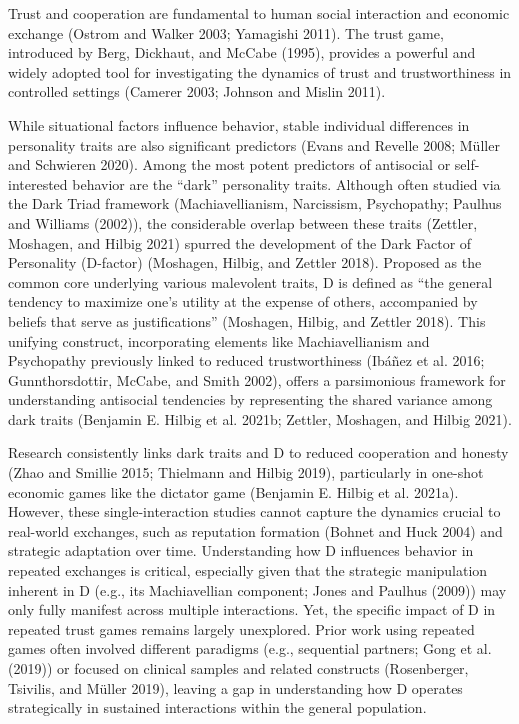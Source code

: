 \documentclass[
]{article}
\begin{document}
Trust and cooperation are fundamental to human social interaction and economic exchange (Ostrom and Walker 2003; Yamagishi 2011). The trust game, introduced by Berg, Dickhaut, and McCabe (1995), provides a powerful and widely adopted tool for investigating the dynamics of trust and trustworthiness in controlled settings (Camerer 2003; Johnson and Mislin 2011).

While situational factors influence behavior, stable individual differences in personality traits are also significant predictors (Evans and Revelle 2008; Müller and Schwieren 2020). Among the most potent predictors of antisocial or self-interested behavior are the ``dark'' personality traits. Although often studied via the Dark Triad framework (Machiavellianism, Narcissism, Psychopathy; Paulhus and Williams (2002)), the considerable overlap between these traits (Zettler, Moshagen, and Hilbig 2021) spurred the development of the Dark Factor of Personality (D-factor) (Moshagen, Hilbig, and Zettler 2018). Proposed as the common core underlying various malevolent traits, D is defined as ``the general tendency to maximize one's utility at the expense of others, accompanied by beliefs that serve as justifications'' (Moshagen, Hilbig, and Zettler 2018). This unifying construct, incorporating elements like Machiavellianism and Psychopathy previously linked to reduced trustworthiness (Ibáñez et al. 2016; Gunnthorsdottir, McCabe, and Smith 2002), offers a parsimonious framework for understanding antisocial tendencies by representing the shared variance among dark traits (Benjamin E. Hilbig et al. 2021b; Zettler, Moshagen, and Hilbig 2021).

Research consistently links dark traits and D to reduced cooperation and honesty (Zhao and Smillie 2015; Thielmann and Hilbig 2019), particularly in one-shot economic games like the dictator game (Benjamin E. Hilbig et al. 2021a). However, these single-interaction studies cannot capture the dynamics crucial to real-world exchanges, such as reputation formation (Bohnet and Huck 2004) and strategic adaptation over time. Understanding how D influences behavior in repeated exchanges is critical, especially given that the strategic manipulation inherent in D (e.g., its Machiavellian component; Jones and Paulhus (2009)) may only fully manifest across multiple interactions. Yet, the specific impact of D in repeated trust games remains largely unexplored. Prior work using repeated games often involved different paradigms (e.g., sequential partners; Gong et al. (2019)) or focused on clinical samples and related constructs (Rosenberger, Tsivilis, and Müller 2019), leaving a gap in understanding how D operates strategically in sustained interactions within the general population.
\end{document}
